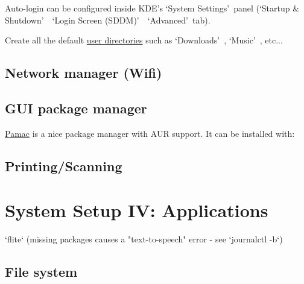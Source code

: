 
Auto-login can be configured inside KDE's \lq System Settings\rq\ panel (\lq Startup \& Shutdown\rq\ \rightarrow\ \lq Login Screen (SDDM)\rq\ \rightarrow\ \lq Advanced\rq\ tab).

\begin{blocksection}
	Create all the default \href{https://wiki.archlinux.org/index.php/XDG_user_directories}{user directories} such as \lq Downloads\rq\ , \lq Music\rq\  , etc...
\end{blocksection}

\subsection{Network manager (Wifi)}

\subsection{GUI package manager}

\href{https://wiki.manjaro.org/index.php?title=Pamac}{Pamac} is a nice package manager with AUR support. It can be installed with:


\subsection{Printing/Scanning}


\section{System Setup IV: Applications}

`flite` (missing packages causes a "text-to-speech" error - see `journalctl -b`)


\subsection{File system}

